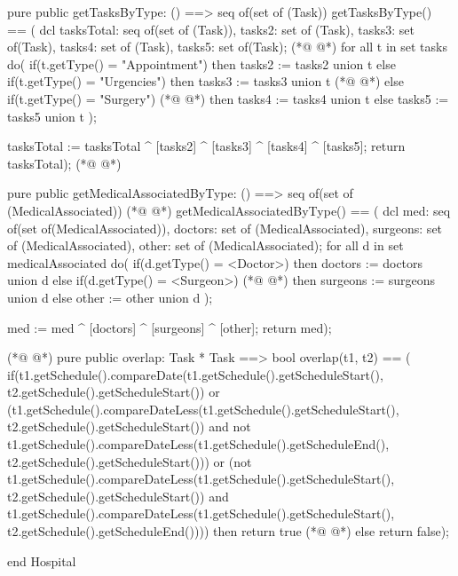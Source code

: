 \begin{vdmpp}[breaklines=true]
 pure public getTasksByType: () ==> seq of(set of (Task))
  getTasksByType() == (
              dcl tasksTotal: seq of(set of (Task)), tasks2: set of (Task), tasks3: set of(Task), tasks4: set of (Task), tasks5: set of(Task);
(*@
\label{removeTask:57}
@*)
              for all t in set tasks do(
               if(t.getType() = "Appointment")
                then tasks2 := tasks2 union {t}
               else if(t.getType() = "Urgencies")
                then tasks3 := tasks3 union {t}
(*@
\label{getAppointments:62}
@*)
               else if(t.getType() = "Surgery")
(*@
\label{getTasksByType:63}
@*)
                then tasks4 := tasks4 union {t}
               else
                tasks5 := tasks5 union {t}
               );
                
              tasksTotal := tasksTotal ^ [tasks2] ^ [tasks3] ^ [tasks4] ^ [tasks5];
              return tasksTotal);
(*@
\label{getSurgeries:70}
@*)

 pure public getMedicalAssociatedByType: () ==> seq of(set of (MedicalAssociated))
(*@
\label{getMedicalAssociatedByType:72}
@*)
  getMedicalAssociatedByType() == (
           dcl med: seq of(set of(MedicalAssociated)), doctors: set of (MedicalAssociated), surgeons: set of (MedicalAssociated), other: set of (MedicalAssociated);
           for all d in set medicalAssociated do(
            if(d.getType() = <Doctor>)
             then doctors := doctors union {d}
            else if(d.getType() = <Surgeon>)
(*@
\label{getOther:78}
@*)
             then surgeons := surgeons union {d}
            else
             other := other union {d}
            );
            
            med := med ^ [doctors] ^ [surgeons] ^ [other];
           return med);
           
(*@
\label{getDoctors:86}
@*)
 pure public overlap: Task * Task ==> bool
  overlap(t1, t2) == (
             if(t1.getSchedule().compareDate(t1.getSchedule().getScheduleStart(), t2.getSchedule().getScheduleStart()) 
              or (t1.getSchedule().compareDateLess(t1.getSchedule().getScheduleStart(), t2.getSchedule().getScheduleStart()) 
              and not t1.getSchedule().compareDateLess(t1.getSchedule().getScheduleEnd(), t2.getSchedule().getScheduleStart()))
              or (not t1.getSchedule().compareDateLess(t1.getSchedule().getScheduleStart(), t2.getSchedule().getScheduleStart()) 
              and t1.getSchedule().compareDateLess(t1.getSchedule().getScheduleStart(), t2.getSchedule().getScheduleEnd())))
              then return true
(*@
\label{geNormalDoctors:94}
@*)
             else
              return false);
              
end Hospital
\end{vdmpp}
